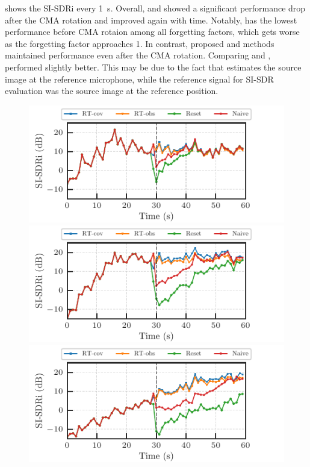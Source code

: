 \documentclass[sip,biber]{now-journal}
\begin{document}
 shows the SI-SDRi every \SI{1}{\second}.
Overall, \NaiveIVA{} and \ResetIVA{} showed a significant performance drop after the CMA rotation and improved again with time.
Notably, \ResetIVA{} has the lowest performance before CMA rotaion among all forgetting factors, which gets worse as the forgetting factor approaches 1.
In contrast, proposed \RTCov{} and \RTObs{} methods maintained performance even after the CMA rotation.
Comparing \RTCov{} and \RTObs{}, \RTCov{} performed slightly better.
This may be due to the fact that \RTObs{} estimates the source image at the reference microphone, while the reference signal for SI-SDR evaluation was the source image at the reference position.
\begin{figure}[t]
  \begin{minipage}[t]{\linewidth}
    \centering\includegraphics{figures/plots/online/Gauss_8000_fft4096_900.pdf}\label{fig:plot:gauss:900}
    \centering\includegraphics{figures/plots/online/Gauss_8000_fft4096_950.pdf}\label{fig:plot:gauss:950}
    \centering\includegraphics{figures/plots/online/Gauss_8000_fft4096_980.pdf}\label{fig:plot:gauss:980}

\end{minipage}
\end{figure}
\end{document}
